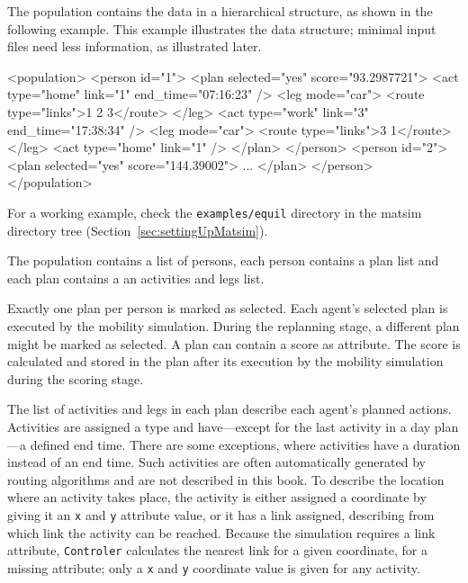 The population contains the data in a hierarchical structure, as shown in the following example.  This example illustrates the data structure; minimal input files need less information, as illustrated later.
\begin{xml}
<population> 
   <person id="1"> 
      <plan selected="yes" score="93.2987721"> 
         <act type="home" link="1" end_time="07:16:23" /> 
         <leg mode="car"> 
            <route type="links">1 2 3</route> 
         </leg> 
         <act type="work" link="3" end_time="17:38:34" /> 
         <leg mode="car"> 
            <route type="links">3 1</route> 
         </leg> 
         <act type="home" link="1" /> 
      </plan> 
   </person> 
   <person id="2"> 
      <plan selected="yes" score="144.39002"> 
         ...
      </plan> 
   </person> 
</population>
\end{xml}
For a working example, check the \lstinline{examples/equil} directory in the \gls{matsim} directory tree (\cf Section~\ref{sec:settingUpMatsim}).

The population contains a list of persons, each person contains a plan list and each plan contains a an activities and legs list.

Exactly one \gls{plan} per person is marked as selected. Each agent's selected plan is executed by the mobility simulation. During the \gls{replanning} stage, a different plan might be marked as selected. A \gls{plan} can contain a score as attribute. The score is calculated and stored in the plan after its execution by the mobility simulation during the scoring stage.

The list of activities and legs in each plan describe each agent's planned actions. Activities are assigned  a type and have---except for the last activity in a day plan---a defined end time. There are some exceptions, where activities have a duration instead of an end time. Such activities are often automatically generated by routing algorithms and are not described in this book. To describe the location where an activity takes place, the activity is either assigned a coordinate by giving it an \lstinline|x| and \lstinline|y| attribute value, or it has a link assigned, describing from which link the activity can be reached. Because the simulation requires a link attribute, \lstinline|Controler| calculates the nearest link for a given coordinate, for a missing attribute; only a \lstinline|x| and \lstinline|y| coordinate value is given for any activity.

